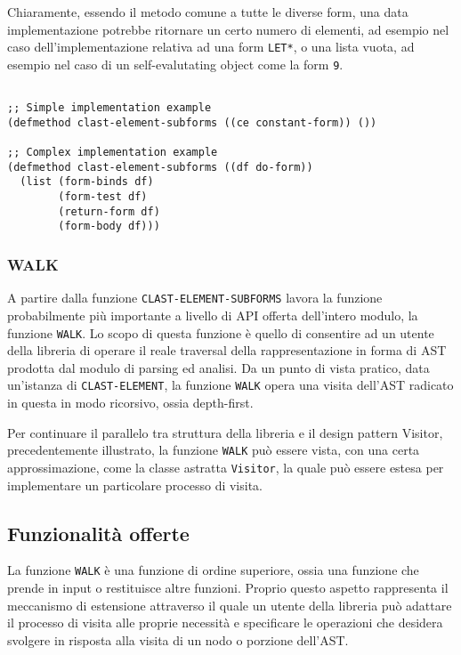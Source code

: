 Chiaramente, essendo il metodo comune a tutte le diverse form, una data
implementazione potrebbe ritornare un certo numero di elementi, ad esempio nel
caso dell'implementazione relativa ad una form \texttt{LET*}, o una lista vuota,
ad esempio nel caso di un self-evalutating object come la form \texttt{9}.

\begin{lstlisting}[caption=Esempi di implementazione del metodo
\texttt{CLAST-ELEMENT-SUBFORMS}]

;; Simple implementation example
(defmethod clast-element-subforms ((ce constant-form)) ())

;; Complex implementation example
(defmethod clast-element-subforms ((df do-form))
  (list (form-binds df)
        (form-test df)
        (return-form df)
        (form-body df)))

\end{lstlisting}

\subsubsection{WALK}
\label{walk}

A partire dalla funzione \texttt{CLAST-ELEMENT-SUBFORMS} lavora la funzione
probabilmente più importante a livello di API offerta dell'intero modulo, la
funzione \texttt{WALK}. Lo scopo di questa funzione è quello di consentire ad un
utente della libreria di operare il reale traversal della rappresentazione in
forma di AST prodotta dal modulo di parsing ed analisi. Da un punto di vista
pratico, data un'istanza di \texttt{CLAST-ELEMENT}, la funzione \texttt{WALK}
opera una visita dell'AST radicato in questa in modo ricorsivo, ossia
depth-first.

Per continuare il parallelo tra struttura della libreria e il design pattern
Visitor, precedentemente illustrato, la funzione \texttt{WALK} può essere vista,
con una certa approssimazione, come la classe astratta \texttt{Visitor}, la
quale può essere estesa per implementare un particolare processo di visita.

\subsection{Funzionalità offerte}

La funzione \texttt{WALK} è una funzione di ordine superiore, ossia una funzione
che prende in input o restituisce altre funzioni. Proprio questo aspetto
rappresenta il meccanismo di estensione attraverso il quale un utente della
libreria può adattare il processo di visita alle proprie necessità e specificare
le operazioni che desidera svolgere in risposta alla visita di un nodo o
porzione dell'AST.

